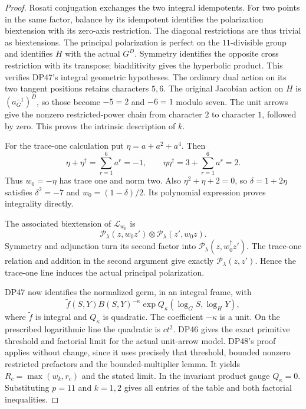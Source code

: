 \begin{proof}
Rosati conjugation exchanges the two integral idempotents.
For two points in the same factor, balance by its idempotent identifies the polarization biextension with its zero-axis restriction.
The diagonal restrictions are thus trivial as biextensions.
The principal polarization is perfect on the $11$-divisible group and identifies $H$ with the actual $G^D$.
Symmetry identifies the opposite cross restriction with its transpose; biadditivity gives the hyperbolic product.
This verifies DP47's integral geometric hypotheses.
The ordinary dual action on its two tangent positions retains characters $5,6$.
The original Jacobian action on $H$ is $(a_G^{-1})^D$, so those become $-5=2$ and $-6=1$ modulo seven.
The unit arrows give the nonzero restricted-power chain from character $2$ to character $1$, followed by zero.
This proves the intrinsic description of $k$.

For the trace-one calculation put $\eta=a+a^2+a^4$.
Then
\[
 \eta+\eta^\dagger=\sum_{r=1}^6a^r=-1,\qquad
 \eta\eta^\dagger=3+\sum_{r=1}^6a^r=2.
\]
Thus $w_0=-\eta$ has trace one and norm two.
Also $\eta^2+\eta+2=0$, so $\delta=1+2\eta$ satisfies
$\delta^2=-7$ and $w_0=(1-\delta)/2$.
Its polynomial expression proves integrality directly.

The associated biextension of $\mathcal L_{w_0}$ is
\[
 \mathcal P_\lambda(z,w_0z')\otimes
 \mathcal P_\lambda(z',w_0z).
\]
Symmetry and adjunction turn its second factor into
$\mathcal P_\lambda(z,w_0^\dagger z')$.
The trace-one relation and addition in the second argument give exactly
$\mathcal P_\lambda(z,z')$.
Hence the trace-one line induces the actual principal polarization.

DP47 now identifies the normalized germ, in an integral frame, with
\[
 \widetilde f(S,Y)B(S,Y)^{-\kappa}
       \exp Q_\kappa(\log_GS,\log_HY),
\]
where $\widetilde f$ is integral and $Q_\kappa$ is quadratic.
The coefficient $-\kappa$ is a unit.
On the prescribed logarithmic line the quadratic is $ct^2$.
DP46 gives the exact primitive threshold and factorial limit for the actual unit-arrow model.
DP48's proof applies without change, since it uses precisely that threshold, bounded nonzero restricted prefactors and the bounded-multiplier lemma.
It yields $R_c=\max(w_k,r_c)$ and the stated limit.
In the invariant product gauge $Q_\kappa=0$.
Substituting $p=11$ and $k=1,2$ gives all entries of the table and both factorial inequalities.


\end{proof}
